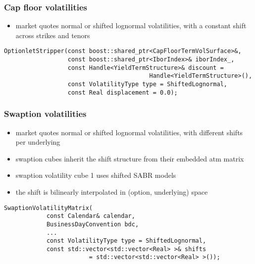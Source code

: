 \documentclass[10pt,German]{beamer}
\begin{document}
\begin{frame}[fragile]
\frametitle{Cap floor volatilities}
\begin{itemize}
\item market quotes normal or shifted lognormal volatilities, with a constant shift across strikes and tenors
\end{itemize}
\begin{verbatim}
OptionletStripper(const boost::shared_ptr<CapFloorTermVolSurface>&,
                  const boost::shared_ptr<IborIndex>& iborIndex_,
                  const Handle<YieldTermStructure>& discount =
                                         Handle<YieldTermStructure>(),
                  const VolatilityType type = ShiftedLognormal,
                  const Real displacement = 0.0);
\end{verbatim}
\end{frame}

\begin{frame}[fragile]
\frametitle{Swaption volatilities}
\begin{itemize}
\item market quotes normal or shifted lognormal volatilities, with different shifts per underlying
\item swaption cubes inherit the shift structure from their embedded atm matrix
\item swaption volatility cube 1 uses shifted SABR models
\item the shift is bilinearly interpolated in (option, underlying) space
\end{itemize}
\begin{verbatim}
SwaptionVolatilityMatrix(
            const Calendar& calendar,
            BusinessDayConvention bdc,
            ...
            const VolatilityType type = ShiftedLognormal,
            const std::vector<std::vector<Real> >& shifts
                        = std::vector<std::vector<Real> >());
\end{verbatim}
\end{frame}
\end{document}
